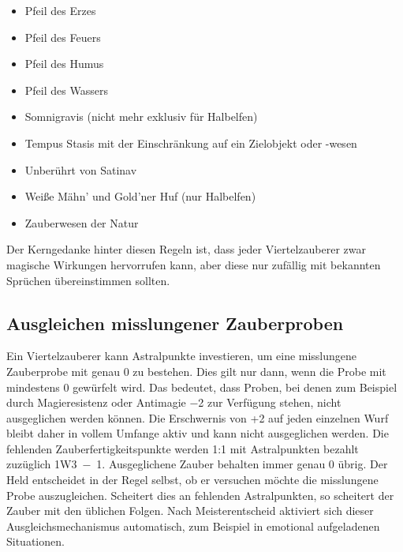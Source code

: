 \begin{itemize}
\begin{itemize}
	\item Pfeil des Erzes
	\item Pfeil des Feuers
	\item Pfeil des Humus
	\item Pfeil des Wassers
	\item Somnigravis (nicht mehr exklusiv für Halbelfen)
	\item Tempus Stasis mit der Einschränkung auf ein Zielobjekt oder -wesen
	\item Unberührt von Satinav
	\item Weiße Mähn' und Gold'ner Huf (nur Halbelfen)
	\item Zauberwesen der Natur
\end{itemize}

\end{itemize}
Der Kerngedanke hinter diesen Regeln ist, dass jeder Viertelzauberer zwar magische Wirkungen hervorrufen kann, aber diese nur zufällig mit bekannten Sprüchen übereinstimmen sollten.

\subsection{Ausgleichen misslungener Zauberproben}
Ein Viertelzauberer kann Astralpunkte investieren, um eine misslungene Zauberprobe mit genau \SI{0}{\ZfPstern} zu bestehen. Dies gilt nur dann, wenn die Probe mit mindestens \SI{0}{\ZfP} gewürfelt wird. Das bedeutet, dass Proben, bei denen zum Beispiel durch Magieresistenz oder Antimagie \SI{-2}{\ZfP} zur Verfügung stehen, nicht ausgeglichen werden können. Die Erschwernis von +2 auf jeden einzelnen Wurf bleibt daher in vollem Umfange aktiv und kann nicht ausgeglichen werden. Die fehlenden Zauberfertigkeitspunkte werden 1:1 mit Astralpunkten bezahlt zuzüglich 1W3~−~\SI{1}{\AsP}. Ausgeglichene Zauber behalten immer genau \SI{0}{\ZfPstern} übrig. Der Held entscheidet in der Regel selbst, ob er versuchen möchte die misslungene Probe auszugleichen. Scheitert dies an fehlenden Astralpunkten, so scheitert der Zauber mit den üblichen Folgen. Nach Meisterentscheid aktiviert sich dieser Ausgleichsmechanismus automatisch, zum Beispiel in emotional aufgeladenen Situationen.

